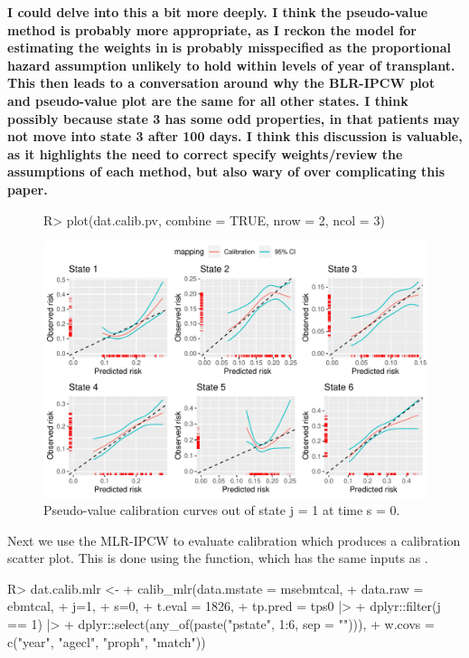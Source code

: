 \documentclass[article,shortnames]{jss}
\begin{document}
\textbf{I could delve into this a bit more deeply. I think the pseudo-value method is probably more appropriate, as I reckon the model for estimating the weights in}  \textbf{is probably misspecified as the proportional hazard assumption unlikely to hold within levels of year of transplant. This then leads to a conversation around why the BLR-IPCW plot and pseudo-value plot are the same for all other states. I think possibly because state 3 has some odd properties, in that patients may not move into state 3 after 100 days. I think this discussion is valuable, as it highlights the need to correct specify weights/review the assumptions of each method, but also wary of over complicating this paper.}

\begin{figure}
\centering
\begin{Schunk}
\begin{Sinput}
R> plot(dat.calib.pv, combine = TRUE, nrow = 2, ncol = 3)
\end{Sinput}
\end{Schunk}
\includegraphics{calibmsm-jss-20230613-008}
\caption{\label{fig:pvj1s0} Pseudo-value calibration curves out of state j =  1 at time s = 0.}
\end{figure}

Next we use the MLR-IPCW to evaluate calibration which produces a calibration scatter plot. This is done using the  function, which has the same inputs as .

\begin{Schunk}
\begin{Sinput}
R> dat.calib.mlr <-
+    calib_mlr(data.mstate = msebmtcal,
+                   data.raw = ebmtcal,
+                   j=1,
+                   s=0,
+                   t.eval = 1826,
+                   tp.pred = tps0 |>
+                     dplyr::filter(j == 1) |>
+                     dplyr::select(any_of(paste("pstate", 1:6, sep = ""))),
+                   w.covs = c("year", "agecl", "proph", "match"))
\end{Sinput}
\end{Schunk}
\end{document}

